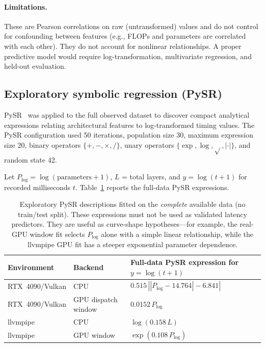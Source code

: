 \documentclass[10pt,twocolumn,letterpaper]{article}
\begin{document}
\paragraph{Limitations.}
These are Pearson correlations on raw (untransformed) values and do not control for confounding between features (e.g., FLOPs and parameters are correlated with each other). They do not account for nonlinear relationships. A proper predictive model would require log-transformation, multivariate regression, and held-out evaluation.

\subsection{Exploratory symbolic regression (PySR)}

PySR~\cite{cranmer2023pysr} was applied to the full observed dataset to discover compact analytical expressions relating architectural features to log-transformed timing values. The PySR configuration used 50 iterations, population size 30, maximum expression size 20, binary operators $\{+, -, \times, /\}$, unary operators $\{\exp, \log, \sqrt{}, |\cdot|\}$, and random state 42.

Let $P_{\log} = \log(\text{parameters} + 1)$, $L$ = total layers, and $y = \log(t + 1)$ for recorded milliseconds $t$. Table~\ref{tab:pysr} reports the full-data PySR expressions.

\begin{table}[t]
\centering\small
\begin{tabular}{lll}
\toprule
Environment & Backend & Full-data PySR expression for $y = \log(t+1)$ \\
\midrule
RTX~4090/Vulkan & CPU & $0.515\,\left|\left|P_{\log} - 14.764\right| - 6.841\right|$ \\
RTX~4090/Vulkan & GPU dispatch window & $0.0152\,P_{\log}$ \\
llvmpipe & CPU & $\log(0.158\,L)$ \\
llvmpipe & GPU window & $\exp(0.108\,P_{\log})$ \\
\bottomrule
\end{tabular}
\caption{Exploratory PySR descriptions fitted on the \emph{complete} available data (no train/test split). These expressions must not be used as validated latency predictors. They are useful as curve-shape hypotheses---for example, the real-GPU window fit selects $P_{\log}$ alone with a simple linear relationship, while the llvmpipe GPU fit has a steeper exponential parameter dependence.}
\label{tab:pysr}
\end{table}
\end{document}
